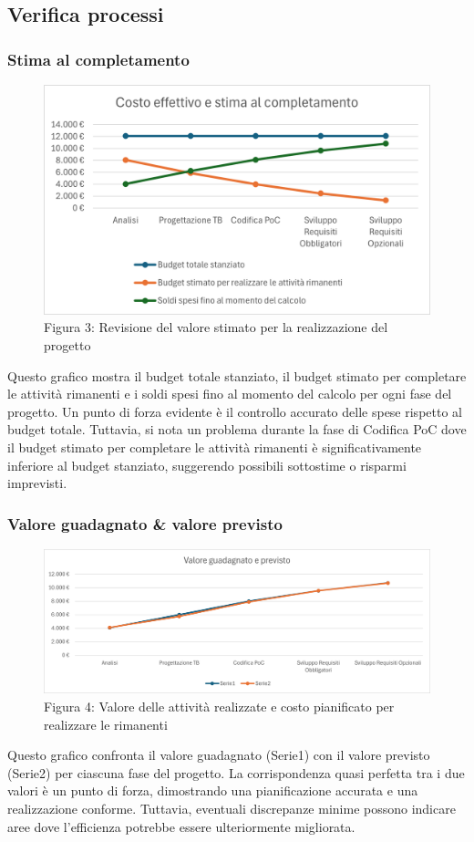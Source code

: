 \documentclass{article}
\begin{document}
\subsection{Verifica processi}
\subsubsection{Stima al completamento}
\begin{figure}[H]
    \centering
    \includegraphics{documenti/grafici/CostoEffettivoEStimaAlCompletamentoPB.png}
    \caption{Figura 3: Revisione del valore stimato per la realizzazione del progetto}
    \end{figure}
    Questo grafico mostra il budget totale stanziato, il budget stimato per completare le attività rimanenti e i soldi spesi fino al momento del calcolo per ogni fase del progetto. Un punto di forza evidente è il controllo accurato delle spese rispetto al budget totale. Tuttavia, si nota un problema durante la fase di Codifica PoC dove il budget stimato per completare le attività rimanenti è significativamente inferiore al budget stanziato, suggerendo possibili sottostime o risparmi imprevisti.
\subsubsection{Valore guadagnato \& valore previsto}
\begin{figure}[H]
    \centering
    \includegraphics{documenti/grafici/ValoreGuadagnatoEPrevistoPB.png}
    \caption{Figura 4: Valore delle attività realizzate e costo pianificato per realizzare le rimanenti}
    \end{figure}
    Questo grafico confronta il valore guadagnato (Serie1) con il valore previsto (Serie2) per ciascuna fase del progetto. La corrispondenza quasi perfetta tra i due valori è un punto di forza, dimostrando una pianificazione accurata e una realizzazione conforme. Tuttavia, eventuali discrepanze minime possono indicare aree dove l'efficienza potrebbe essere ulteriormente migliorata.
\end{document}
